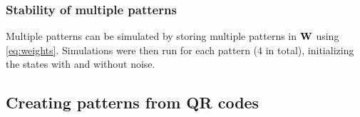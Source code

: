 \subsubsection*{Stability of multiple patterns}
Multiple patterns can be simulated by storing multiple patterns in $\bf W$ using \cref{eq:weights}. Simulations were then run for each pattern (4 in total), initializing the states with and without noise.

\subsection{Creating patterns from QR codes}




